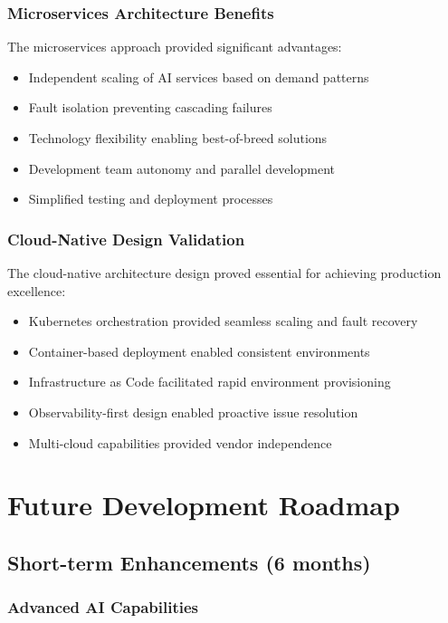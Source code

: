 \subsubsection{Microservices Architecture Benefits}

The microservices approach provided significant advantages:

\begin{itemize}
    \item Independent scaling of AI services based on demand patterns
    \item Fault isolation preventing cascading failures
    \item Technology flexibility enabling best-of-breed solutions
    \item Development team autonomy and parallel development
    \item Simplified testing and deployment processes
\end{itemize}

\subsubsection{Cloud-Native Design Validation}

The cloud-native architecture design proved essential for achieving production excellence:

\begin{itemize}
    \item Kubernetes orchestration provided seamless scaling and fault recovery
    \item Container-based deployment enabled consistent environments
    \item Infrastructure as Code facilitated rapid environment provisioning
    \item Observability-first design enabled proactive issue resolution
    \item Multi-cloud capabilities provided vendor independence
\end{itemize}

\section{Future Development Roadmap}

\subsection{Short-term Enhancements (6 months)}

\subsubsection{Advanced AI Capabilities}

